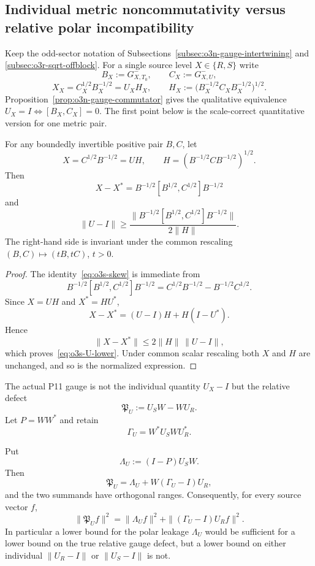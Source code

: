 
\subsection{Individual metric noncommutativity versus relative polar incompatibility}
\label{subsec:o3s-relative-polar}

Keep the odd-sector notation of Subsections~\ref{subsec:o3n-gauge-intertwining} and
\ref{subsec:o3r-sqrt-offblock}.  For a single source level $X\in\{R,S\}$ write
\[
 B_X:=G_{X,T_0}^-,\qquad C_X:=G_{X,U}^-,
\]
\[
 X_X=C_X^{1/2}B_X^{-1/2}=U_XH_X,
 \qquad
 H_X:=\bigl(B_X^{-1/2}C_XB_X^{-1/2}\bigr)^{1/2}.
\]
Proposition~\ref{prop:o3n-gauge-commutator} gives the qualitative equivalence
$U_X=I\iff[B_X,C_X]=0$.  The first point below is the scale-correct quantitative version
for one metric pair.

\begin{proposition}
\label{prop:o3s-individual-commutator}
For any boundedly invertible positive pair $B,C$, let
\[
 X=C^{1/2}B^{-1/2}=UH,
 \qquad
 H=(B^{-1/2}CB^{-1/2})^{1/2}.
\]
Then
\[
 X-X^*
 =B^{-1/2}[B^{1/2},C^{1/2}]B^{-1/2}
\tag{O3S.1}\label{eq:o3s-skew}
\]
and
\[
 \boxed{
 \|U-I\|
 \ge
 \frac{
 \|B^{-1/2}[B^{1/2},C^{1/2}]B^{-1/2}\|
 }{2\|H\|}.
 }
\tag{O3S.2}\label{eq:o3s-U-lower}
\]
The right-hand side is invariant under the common rescaling $(B,C)\mapsto(tB,tC)$,
$t>0$.
\end{proposition}

\begin{proof}
The identity~\eqref{eq:o3s-skew} is immediate from
\[
 B^{-1/2}[B^{1/2},C^{1/2}]B^{-1/2}
 =C^{1/2}B^{-1/2}-B^{-1/2}C^{1/2}.
\]
Since $X=UH$ and $X^*=HU^*$,
\[
 X-X^*=(U-I)H+H(I-U^*).
\]
Hence
\[
 \|X-X^*\|\le2\|H\|\,\|U-I\|,
\]
which proves~\eqref{eq:o3s-U-lower}.  Under common scalar rescaling both $X$ and $H$
are unchanged, and so is the normalized expression.
\end{proof}

The actual P11 gauge is not the individual quantity $U_X-I$ but the relative defect
\[
 \mathfrak P_U:=U_SW-WU_R.
\tag{O3S.3}\label{eq:o3s-relative-defect}
\]
Let $P=WW^*$ and retain
\[
 \Gamma_U=W^*U_SWU_R^*.
\]

\begin{proposition}
\label{prop:o3s-relative-decomposition}
Put
\[
 \Lambda_U:=(I-P)U_SW.
\]
Then
\[
 \boxed{
 \mathfrak P_U
 =\Lambda_U+W(\Gamma_U-I)U_R,
 }
\tag{O3S.4}\label{eq:o3s-relative-decomp}
\]
and the two summands have orthogonal ranges.  Consequently, for every source vector
$f$,
\[
 \boxed{
 \|\mathfrak P_Uf\|^2
 =\|\Lambda_Uf\|^2
  +\|(\Gamma_U-I)U_Rf\|^2.
 }
\tag{O3S.5}\label{eq:o3s-relative-pythagoras}
\]
In particular a lower bound for the polar leakage $\Lambda_U$ would be sufficient for a
lower bound on the true relative gauge defect, but a lower bound on either individual
$\|U_R-I\|$ or $\|U_S-I\|$ is not.
\end{proposition}

